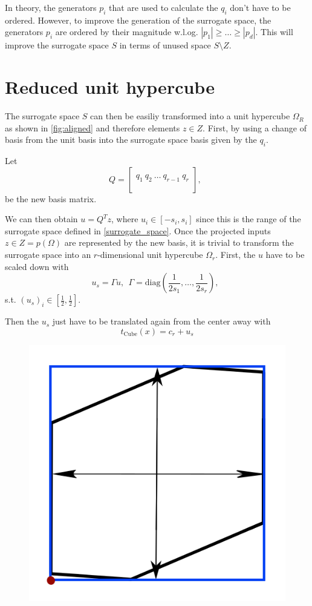 \documentclass[
  a4paper,  %
  twoside,  %
  bibliography=totoc,
  headsepline,
  cleardoublepage=empty,
  parskip=half,
  draft=false
]{scrbook}
\begin{document}
In theory, the generators $p_i$ that are used to calculate the $q_i$ don't have to be ordered.
However, to improve the generation of the surrogate space, the generators $p_i$ are ordered by their magnitude w.l.og. $|p_1|\geq \dots \geq |p_d|$.
This will improve the surrogate space $S$ in terms of unused space $S \setminus Z$.


\section{Reduced unit hypercube}

The surrogate space $S$ can then be easiliy transformed into a unit hypercube $\Omega_R$ as shown in \ref{fig:aligned} and therefore elements $z \in Z$.
First, by using a change of basis from the unit basis into the surrogate space basis given by the $q_i$.

Let
\begin{equation}
Q=\begin{bmatrix}
  \\
    q_1 ~ q_2 ~ \dots ~q_{r-1} ~ q_r\\
    \\
  \end{bmatrix}
  , ~~
\label{alignment}
\end{equation}
be the new basis matrix.

We can then obtain $u=Q^T z$, where $u_i \in [-s_i,s_i]$ since this is the range of the surrogate space defined in \ref{surrogate_space}.
Once the projected inputs $z \in Z=p(\Omega)$ are represented by the new basis, it is trivial to transform the surrogate space into an $r$-dimensional unit hypercube $\Omega_r$.
First, the $u$ have to be scaled down with
\begin{equation}
u_s=\Gamma u, ~~ \Gamma=\text{diag}(\frac{1}{2 s_1}, \dots, \frac{1}{2 s_r}), ~~
\label{alignment}
\end{equation}
s.t. $(u_s)_i \in [\frac{1}{2},\frac{1}{2}]$.

Then the $u_s$ just have to be translated again from the center away with
\begin{equation}
t_{\text{Cube}}(x)=c_r + u_s
\end{equation}

\begin{figure}[H]
\centering
  \includegraphics[width=0.4\linewidth]{graphics/s_unit}
  \label{fig:f2_combined_rel_errors_inter}
\end{figure}
\end{document}
